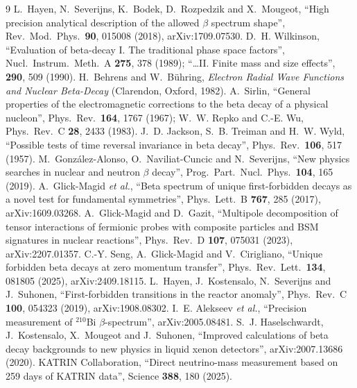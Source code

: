 \begin{thebibliography}{9}
 L.~Hayen, N.~Severijns, K.~Bodek, D.~Rozpedzik and X.~Mougeot, ``High precision analytical description of the allowed $\beta$ spectrum shape'', Rev.\ Mod.\ Phys.\ \textbf{90}, 015008 (2018), arXiv:1709.07530.
 D.~H. Wilkinson, ``Evaluation of beta-decay I. The traditional phase space factors'', Nucl.\ Instrum.\ Meth.\ A \textbf{275}, 378 (1989); ``\ldots II. Finite mass and size effects'', \textbf{290}, 509 (1990).
 H.~Behrens and W.~B\"uhring, \emph{Electron Radial Wave Functions and Nuclear Beta-Decay} (Clarendon, Oxford, 1982).
 A.~Sirlin, ``General properties of the electromagnetic corrections to the beta decay of a physical nucleon'', Phys.\ Rev.\ \textbf{164}, 1767 (1967); W.~W. Repko and C.-E. Wu, Phys.\ Rev.\ C \textbf{28}, 2433 (1983).
 J.~D. Jackson, S.~B. Treiman and H.~W. Wyld, ``Possible tests of time reversal invariance in beta decay'', Phys.\ Rev.\ \textbf{106}, 517 (1957).
 M.~Gonz\'alez-Alonso, O.~Naviliat-Cuncic and N.~Severijns, ``New physics searches in nuclear and neutron $\beta$ decay'', Prog.\ Part.\ Nucl.\ Phys.\ \textbf{104}, 165 (2019).
 A.~Glick-Magid \emph{et al.}, ``Beta spectrum of unique first-forbidden decays as a novel test for fundamental symmetries'', Phys.\ Lett.\ B \textbf{767}, 285 (2017), arXiv:1609.03268.
 A.~Glick-Magid and D.~Gazit, ``Multipole decomposition of tensor interactions of fermionic probes with composite particles and BSM signatures in nuclear reactions'', Phys.\ Rev.\ D \textbf{107}, 075031 (2023), arXiv:2207.01357.
 C.-Y. Seng, A.~Glick-Magid and V.~Cirigliano, ``Unique forbidden beta decays at zero momentum transfer'', Phys.\ Rev.\ Lett.\ \textbf{134}, 081805 (2025), arXiv:2409.18115.
 L.~Hayen, J.~Kostensalo, N.~Severijns and J.~Suhonen, ``First-forbidden transitions in the reactor anomaly'', Phys.\ Rev.\ C \textbf{100}, 054323 (2019), arXiv:1908.08302.
 I.~E. Alekseev \emph{et al.}, ``Precision measurement of $^{210}$Bi $\beta$-spectrum'', arXiv:2005.08481.
 S.~J. Haselschwardt, J.~Kostensalo, X.~Mougeot and J.~Suhonen, ``Improved calculations of beta decay backgrounds to new physics in liquid xenon detectors'', arXiv:2007.13686 (2020).
 KATRIN Collaboration, ``Direct neutrino-mass measurement based on 259 days of KATRIN data'', Science \textbf{388}, 180 (2025).
\end{thebibliography}

